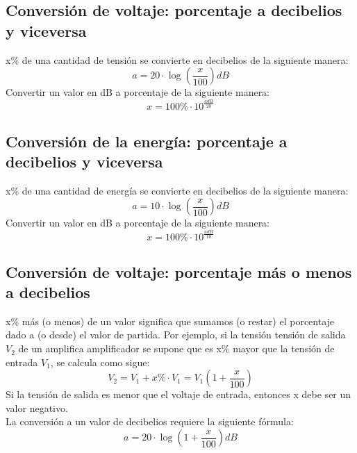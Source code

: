 \documentclass[
	11pt, %
	fleqn, %
	a4paper, %
]{LegrandOrangeBook}
\begin{document}
\subsection{Conversión de voltaje: porcentaje a decibelios y viceversa}
x\% de una cantidad de tensión se convierte en decibelios de la siguiente manera:
\begin{equation}
a=20\cdot\log\left(\frac{x}{100}\right)dB
\end{equation}
Convertir un valor en dB a porcentaje de la siguiente manera:
\begin{equation}
x=100\%\cdot 10^{\frac{a dB}{20}}
\end{equation}
\subsection{Conversión de la energía: porcentaje a decibelios y viceversa}
x\% de una cantidad de energía se convierte en decibelios de la siguiente manera:
\begin{equation}
a=10\cdot\log\left(\frac{x}{100}\right)dB
\end{equation}
Convertir un valor en dB a porcentaje de la siguiente manera:
\begin{equation}
x=100\%\cdot 10^{\frac{a dB}{10}}
\end{equation}
\subsection{Conversión de voltaje: porcentaje más o menos a decibelios}
x\% más (o menos) de un valor significa que sumamos (o restar) el porcentaje dado a (o desde) el valor de partida. Por ejemplo, si la tensión tensión de salida $V_2$ de un amplifica amplificador se supone que es x\% mayor que la
tensión de entrada $V_1$, se calcula como sigue:
\begin{equation}
V_2=V_1 + x\%\cdot V_1= V_1\left(1+\frac{x}{100}\right)
\end{equation}
Si la tensión de salida es menor que el voltaje de entrada, entonces x debe ser un valor negativo.\\
La conversión a un valor de decibelios requiere la siguiente fórmula:
\begin{equation}
a=20\cdot\log\left(1+\frac{x}{100}\right)dB
\end{equation}
\end{document}

